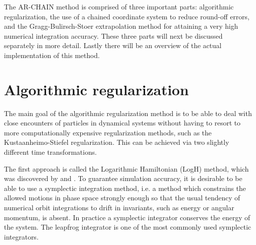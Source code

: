 \documentclass[english, oneside]{HYgradu}
\begin{document}
The AR-CHAIN method is comprised of three important parts: algorithmic regularization, the use of a chained coordinate system to reduce round-off errors, and the Gragg-Bulirsch-Stoer extrapolation method for attaining a very high numerical integration accuracy. These three parts will next be discussed separately in more detail. Lastly there will be an overview of the actual implementation of this method.





\section{Algorithmic regularization}

The main goal of the algorithmic regularization method is to be able to deal with close encounters of particles in dynamical systems without having to resort to more computationally expensive regularization methods, such as the Kustaanheimo-Stiefel regularization. This can be achieved via two slightly different time transformations. 

The first approach is called the Logarithmic Hamiltonian (LogH) method, which was discovered by \cite{mikkola:1999} and \cite{preto:1999}. To guarantee simulation accuracy, it is desirable to be able to use a symplectic integration method, i.e. a method which constrains the allowed motions in phase space strongly enough so that the usual tendency of numerical orbit integrations to drift in invariants, such as energy or angular momentum, is absent. In practice a symplectic integrator conserves the energy of the system. The leapfrog integrator is one of the most commonly used symplectic integrators.
\end{document}
